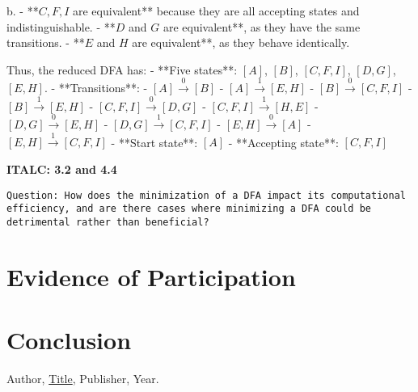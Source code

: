 \documentclass{article}
\theoremstyle{theorem}
\theoremstyle{definition}
\theoremstyle{remark}
\begin{document}
b. 
- **\( C, F, I \) are equivalent** because they are all accepting states and indistinguishable.  
- **\( D \) and \( G \) are equivalent**, as they have the same transitions.  
- **\( E \) and \( H \) are equivalent**, as they behave identically.  

Thus, the reduced DFA has:  
- **Five states**: \( [A] \), \( [B] \), \( [C, F, I] \), \( [D, G] \), \( [E, H] \).  
- **Transitions**:  
  - \( [A] \xrightarrow{0} [B] \)  
  - \( [A] \xrightarrow{1} [E, H] \)  
  - \( [B] \xrightarrow{0} [C, F, I] \)  
  - \( [B] \xrightarrow{1} [E, H] \)  
  - \( [C, F, I] \xrightarrow{0} [D, G] \)  
  - \( [C, F, I] \xrightarrow{1} [H, E] \)  
  - \( [D, G] \xrightarrow{0} [E, H] \)  
  - \( [D, G] \xrightarrow{1} [C, F, I] \)  
  - \( [E, H] \xrightarrow{0} [A] \)  
  - \( [E, H] \xrightarrow{1} [C, F, I] \)  
- **Start state**: \( [A] \)  
- **Accepting state**: \( [C, F, I] \)  

\textbf{ITALC: 3.2 and 4.4}
\begin{lstlisting}
Question: How does the minimization of a DFA impact its computational efficiency, and are there cases where minimizing a DFA could be detrimental rather than beneficial?
\end{lstlisting}

\section{Evidence of Participation}

\section{Conclusion}\label{conclusion}

\begin{thebibliography}{99}
 Author, \href{https://en.wikipedia.org/wiki/LaTeX}{Title}, Publisher, Year.
\end{thebibliography}
\end{document}
